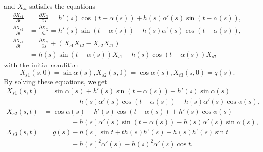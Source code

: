 \documentclass[11pt]{amsart}
\begin{document}
and $X_{si}$ satisfies the equations
\[  \begin{split}
         \frac{\partial X_{s1}}{\partial t} &= \frac{\partial X_{t1}}{\partial s}
             =h'(s)\cos(t-\alpha(s)) + h(s)\alpha'(s)\sin(t-\alpha(s)), \\
     \frac{\partial X_{s2}}{\partial t} &= \frac{\partial X_{t2}}{\partial s}
             =h'(s)\sin(t-\alpha(s)) - h(s)\alpha'(s)\cos(t-\alpha(s)),  \\
     \frac{\partial X_{s3}}{\partial t}
             &= \frac{\partial X_{t3}}{\partial s} + (X_{s1}X_{t2} -
             X_{s2}X_{t1})\\
              &= h(s) \sin ( t-\alpha(s))X_{s1} - h(s) \cos ( t-\alpha(s))X_{s2}
\end{split}       \]
with the initial condition
\[  X_{s1}(s,0)= \sin \alpha (s),
    X_{s2}(s,0)= \cos\alpha (s),
    X_{t3}(s,0)= g(s).  \]
By solving these equations, we get
\[  \begin{split}
    X_{s1}(s,t)&= \sin\alpha(s)+ h'(s)\sin(t-\alpha(s))+h'(s)\sin\alpha(s)  \\
     &\qquad\qquad -h(s)\alpha'(s)\cos(t-\alpha(s))+h(s)\alpha'(s)\cos\alpha(s),\\
    X_{s2}(s,t)&= \cos\alpha(s)- h'(s)\cos(t-\alpha(s))+h'(s)\cos\alpha(s) \\
     &\qquad\qquad -h(s)\alpha'(s)\sin(t-\alpha(s))-h(s)\alpha'(s)\sin\alpha(s),\\
    X_{s3}(s,t)&= g(s)-h(s)\sin t + th(s)h'(s) - h(s)h'(s)\sin t\\
     &\qquad\qquad  + h(s)^2 \alpha'(s)- h(s)^2 \alpha'(s)\cos t.
\end{split}       \]
\end{document}
